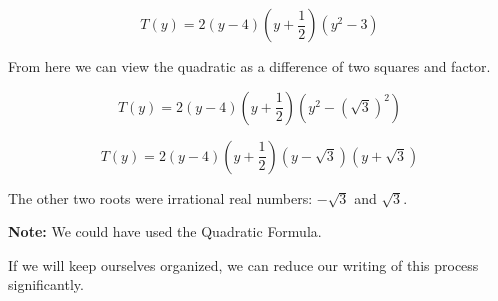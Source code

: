 \documentclass{ximera}
\begin{document}
\begin{explanation}
\[
T(y) = 2 (y-4) \left(y+\frac{1}{2}\right) (y^2  - 3)
\]


From here we can view the quadratic as a difference of two squares and factor. 



\[
T(y) = 2 (y-4) \left(y+\frac{1}{2}\right) (y^2 - (\sqrt{3})^2)
\]



\[
T(y) = 2 (y-4) \left(y+\frac{1}{2}\right) (y - \sqrt{3}) (y + \sqrt{3})
\]


The other two roots were irrational real numbers: $-\sqrt{3}$ and $\sqrt{3}$.



\textbf{Note:} We could have used the Quadratic Formula.


\end{explanation}

If we will keep ourselves organized, we can reduce our writing of this process significantly. 
\end{document}
